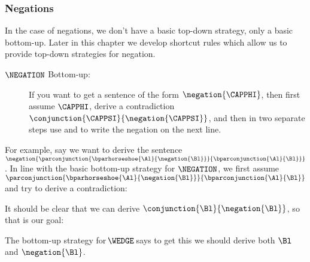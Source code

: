 \subsubsection*{Negations}
In the case of negations, we don't have a basic top-down strategy, only a basic bottom-up.  Later in this chapter we develop shortcut rules which allow us to provide top-down strategies for negation.
\begin{description}
\item[$\NEGATION$ Bottom-up:] If you want to get a sentence of the form $\negation{\CAPPHI}$, then first assume $\CAPPHI$, derive a contradiction $\conjunction{\CAPPSI}{\negation{\CAPPSI}}$, and then in two separate steps use  and  to write the negation on the next line.
\end{description}
For example, say we want to derive the sentence $\negation{\parconjunction{\bparhorseshoe{\Al}{\negation{\Bl}}}{\bparconjunction{\Al}{\Bl}}}$. In line with the basic bottom-up strategy for $\NEGATION$, we first assume $\parconjunction{\bparhorseshoe{\Al}{\negation{\Bl}}}{\bparconjunction{\Al}{\Bl}}$ and try to derive a contradiction:
\begin{gproof}
\galineNCnd{}{}{}
\galineNCnd{}{$\qquad\vdots$}{}
\galineNCnd{}{}{}
\end{gproof}
\noindent{}It should be clear that we can derive $\conjunction{\Bl}{\negation{\Bl}}$, so that is our goal:
\begin{gproof}
\galineNCnd{}{}{}
\galineNCnd{}{$\qquad\vdots$}{}
\galineNCnd{}{}{}
\end{gproof}
The bottom-up strategy for $\!\WEDGE\!$ says to get this we should derive both $\Bl$ and $\negation{\Bl}$.
\begin{gproof}
\galineNCnd{}{}{}
\galineNCnd{}{$\qquad\vdots$}{}
\galineNCnd{}{}{}
\end{gproof}
